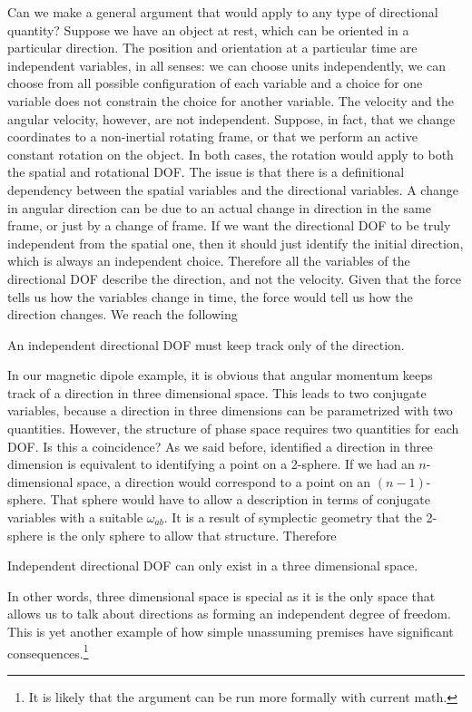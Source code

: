 Can we make a general argument that would apply to any type of directional quantity? Suppose we have an object at rest, which can be oriented in a particular direction. The position and orientation at a particular time are independent variables, in all senses: we can choose units independently, we can choose from all possible configuration of each variable and a choice for one variable does not constrain the choice for another variable. The velocity and the angular velocity, however, are not independent. Suppose, in fact, that we change coordinates to a non-inertial rotating frame, or that we perform an active constant rotation on the object. In both cases, the rotation would apply to both the spatial and rotational DOF. The issue is that there is a definitional dependency between the spatial variables and the directional variables. A change in angular direction can be due to an actual change in direction in the same frame, or just by a change of frame. If we want the directional DOF to be truly independent from the spatial one, then it should just identify the initial direction, which is always an independent choice. Therefore all the variables of the directional DOF describe the direction, and not the velocity. Given that the force tells us how the variables change in time, the force would tell us how the direction changes. We reach the following
\begin{insight}
	An independent directional DOF must keep track only of the direction.
\end{insight}

In our magnetic dipole example, it is obvious that angular momentum keeps track of a direction in three dimensional space. This leads to two conjugate variables, because a direction in three dimensions can be parametrized with two quantities. However, the structure of phase space requires two quantities for each DOF. Is this a coincidence? As we said before, identified a direction in three dimension is equivalent to identifying a point on a 2-sphere. If we had an $n$-dimensional space, a direction would correspond to a point on an $(n-1)$-sphere. That sphere would have to allow a description in terms of conjugate variables with a suitable $\omega_{ab}$. It is a result of symplectic geometry that the 2-sphere is the only sphere to allow that structure. Therefore
\begin{insight}
	Independent directional DOF can only exist in a three dimensional space.
\end{insight}

In other words, three dimensional space is special as it is the only space that allows us to talk about directions as forming an independent degree of freedom. This is yet another example of how simple unassuming premises have significant consequences.\footnote{It is likely that the argument can be run more formally with current math.}

